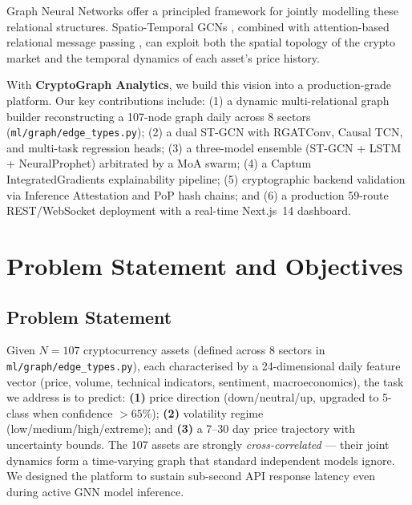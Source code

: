 \documentclass{article}
\begin{document}
Graph Neural Networks offer a principled framework for jointly modelling these relational structures. Spatio-Temporal GCNs \cite{yan2018stgcn}, combined with attention-based relational message passing \cite{velickovic2018gat}, can exploit both the spatial topology of the crypto market and the temporal dynamics of each asset's price history.

With \textbf{CryptoGraph Analytics}, we build this vision into a production-grade platform. Our key contributions include: (1) a dynamic multi-relational graph builder reconstructing a 107-node graph daily across 8 sectors (\texttt{ml/graph/edge\_types.py}); (2) a dual ST-GCN with RGATConv, Causal TCN, and multi-task regression heads; (3) a three-model ensemble (ST-GCN + LSTM + NeuralProphet) arbitrated by a MoA swarm; (4) a Captum IntegratedGradients explainability pipeline; (5) cryptographic backend validation via Inference Attestation and PoP hash chains; and (6) a production 59-route REST/WebSocket deployment with a real-time Next.js~14 dashboard.

\section{Problem Statement and Objectives}

\subsection{Problem Statement}

Given $N=107$ cryptocurrency assets (defined across 8 sectors in \texttt{ml/graph/edge\_types.py}), each characterised by a 24-dimensional daily feature vector (price, volume, technical indicators, sentiment, macroeconomics), the task we address is to predict: \textbf{(1)} price direction (down/neutral/up, upgraded to 5-class when confidence $>65\%$); \textbf{(2)} volatility regime (low/medium/high/extreme); and \textbf{(3)} a 7--30 day price trajectory with uncertainty bounds. The 107 assets are strongly \emph{cross-correlated} --- their joint dynamics form a time-varying graph that standard independent models ignore. We designed the platform to sustain sub-second API response latency even during active GNN model inference.
\end{document}
